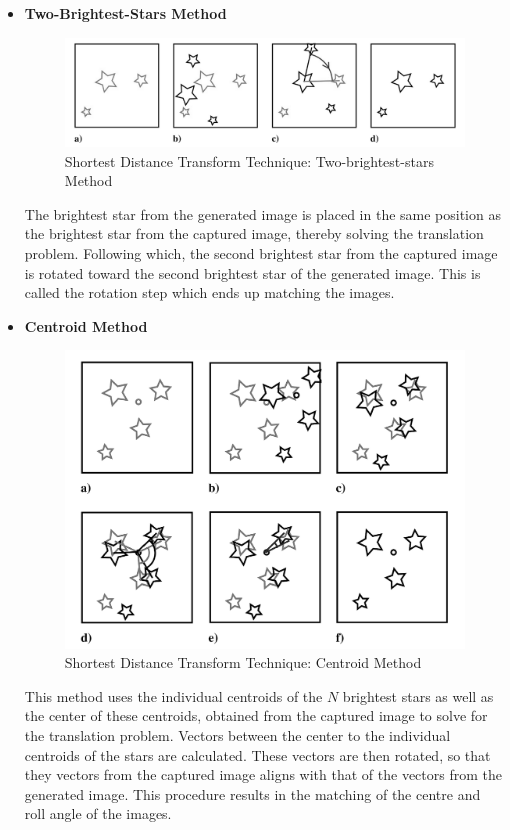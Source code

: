 \documentclass[../../main.tex]{subfiles}
\begin{document}
\begin{itemize}
    \item \textbf{Two-Brightest-Stars Method}
    
    \begin{figure}[h!]
        \centering
        \includegraphics[scale=0.35]{Figures/GNC/shortest_dist_2_brightest.PNG}
        \caption{Shortest Distance Transform Technique: Two-brightest-stars Method}
    \end{figure}
    
    The brightest star from the generated image is placed in the same position as the brightest star from the captured image, thereby solving the translation problem. 
    Following which, the second brightest star from the captured image is rotated toward the second brightest star of the generated image. This is called the rotation step which ends up matching the images.
    
    \item \textbf{Centroid Method}
    
    \begin{figure}[h!]
        \centering
        \includegraphics[scale=0.35]{Figures/GNC/shortest_dist_centroid.PNG}
        \caption{Shortest Distance Transform Technique: Centroid Method}
    \end{figure}
    
    This method uses the individual centroids of the $N$ brightest stars as well as the center of these centroids, obtained from the captured image to solve for the translation problem. 
    Vectors between the center to the individual centroids of the stars are calculated. These vectors are then rotated, so that they vectors from the captured image aligns with that of the vectors from the generated image. This procedure results in the matching of the centre and roll angle of the images.
\end{itemize}
\end{document}
